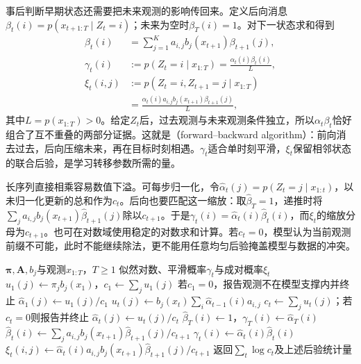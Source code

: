事后判断早期状态还需要把未来观测的影响传回来。定义后向消息$\beta_t(i)=p(x_{t+1:T}\mid Z_t=i)$；未来为空时$\beta_T(i)=1$。对下一状态求和得到
\begin{equation}
  \begin{aligned}
    \beta_t(i)&=\sum_{j=1}^{K}
      a_{i,j}b_j(x_{t+1})\beta_{t+1}(j),\\
    \gamma_t(i)&:=p(Z_t=i\mid x_{1:T})
      =\frac{\alpha_t(i)\beta_t(i)}{L},\\
    \xi_t(i,j)&:=p(Z_t=i,Z_{t+1}=j\mid x_{1:T})\\
      &=\frac{\alpha_t(i)a_{i,j}b_j(x_{t+1})
        \beta_{t+1}(j)}{L},
  \end{aligned}
  \label{eq:pgm-dynamic-backward}
\end{equation}
其中$L=p(x_{1:T})>0$。给定$Z_t$后，过去观测与未来观测条件独立，所以$\alpha_t\beta_t$恰好组合了互不重叠的两部分证据。这就是（forward--backward algorithm）：前向消去过去，后向压缩未来，再在目标时刻相遇。$\gamma_t$适合单时刻平滑，$\xi_t$保留相邻状态的联合后验，是学习转移参数所需的量。

长序列直接相乘容易数值下溢。可每步归一化，令$\widehat\alpha_t(j)=p(Z_t=j\mid x_{1:t})$，以未归一化更新的总和作为$c_t$。后向也要匹配这一缩放：取$\widehat\beta_T=1$，递推时将$\sum_j a_{i,j}b_j(x_{t+1})\widehat\beta_{t+1}(j)$除以$c_{t+1}$。于是$\gamma_t(i)=\widehat\alpha_t(i)\widehat\beta_t(i)$，而$\xi_t$的缩放分母为$c_{t+1}$。也可在对数域使用稳定的对数求和计算。若$c_t=0$，模型认为当前观测前缀不可能，此时不能继续除法，更不能用任意均匀后验掩盖模型与数据的冲突。

\begin{algorithm}
  \label{alg:pgm-dynamic-forward-backward}
  \begin{algorithmic}[1]
    \Require $\bm{\pi},\bm{A},b_j$与观测$x_{1:T}$，$T\geq1$
    \Ensure 似然对数、平滑概率$\gamma_t$与成对概率$\xi_t$
    \State $u_1(j)\gets\pi_jb_j(x_1)$，$c_1\gets\sum_j u_1(j)$
    \State 若$c_1=0$，报告观测不在模型支撑内并终止
    \State $\widehat\alpha_1(j)\gets u_1(j)/c_1$
      \State $u_t(j)\gets b_j(x_t)\sum_i\widehat\alpha_{t-1}(i)a_{i,j}$
      \State $c_t\gets\sum_j u_t(j)$；若$c_t=0$则报告并终止
      \State $\widehat\alpha_t(j)\gets u_t(j)/c_t$
    \EndFor
    \State $\widehat\beta_T(i)\gets1$，$\gamma_T(i)\gets\widehat\alpha_T(i)$
      \State $\widehat\beta_t(i)\gets
        \sum_j a_{i,j}b_j(x_{t+1})\widehat\beta_{t+1}(j)/c_{t+1}$
      \State $\gamma_t(i)\gets\widehat\alpha_t(i)\widehat\beta_t(i)$
      \State $\xi_t(i,j)\gets
        \widehat\alpha_t(i)a_{i,j}b_j(x_{t+1})
        \widehat\beta_{t+1}(j)/c_{t+1}$
    \EndFor
    \State 返回$\sum_t\log c_t$及上述后验统计量
  \end{algorithmic}
\end{algorithm}

